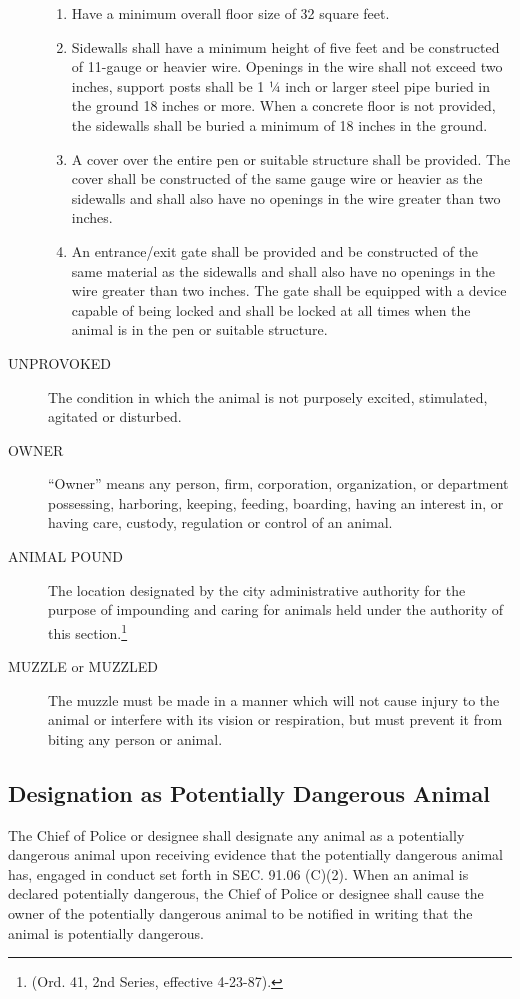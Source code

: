 \begin{description}
    \begin{enumerate}
        \item Have a minimum overall floor size of 32 square feet.
        \item Sidewalls shall have a minimum height of five feet and be constructed of 11-gauge or heavier wire.  Openings in the wire shall not exceed two inches, support posts shall be 1 ¼ inch or larger steel pipe buried in the ground 18 inches or more.  When a concrete floor is not provided, the sidewalls shall be buried a minimum of 18 inches in the ground.
        \item A cover over the entire pen or suitable structure shall be provided.  The cover shall be constructed of the same gauge wire or heavier as the sidewalls and shall also have no openings in the wire greater than two inches.
        \item An entrance/exit gate shall be provided and be constructed of the same material as the sidewalls and shall also have no openings in the wire greater than two inches.  The gate shall be equipped with a device capable of being locked and shall be locked at all times when the animal is in the pen or suitable structure.
    \end{enumerate}
    \item[UNPROVOKED] The condition in which the animal is not purposely excited, stimulated, agitated or disturbed.
    \item[OWNER] “Owner” means any person, firm, corporation, organization, or department possessing, harboring, keeping, feeding, boarding, having an interest in, or having care, custody, regulation or control of an animal.
    \item[ANIMAL POUND] The location designated by the city administrative authority for the purpose of impounding and caring for animals held under the authority of this section.\footnote{(Ord. 41, 2nd Series, effective 4-23-87).}
    \item[MUZZLE or MUZZLED] The muzzle must be made in a manner which will not cause injury to the animal or interfere with its vision or respiration, but must prevent it from biting any person or animal.
\end{description}
\subsection{Designation as Potentially Dangerous Animal}
The Chief of Police or designee shall designate any animal as a potentially dangerous animal upon receiving evidence that the potentially dangerous animal has, engaged in conduct set forth in SEC. 91.06 (C)(2).  When an animal is declared potentially dangerous, the Chief of Police or designee shall cause the owner of the potentially dangerous animal to be notified in writing that the animal is potentially dangerous.
